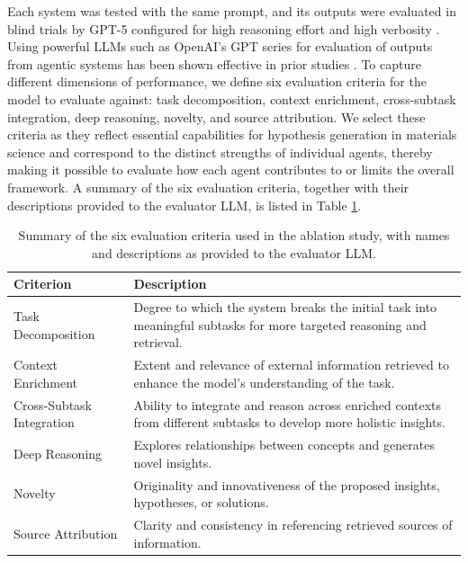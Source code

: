 Each system was tested with the same prompt, and its outputs were evaluated in blind trials by GPT-5 configured for high reasoning effort and high verbosity \cite{openai2024gpt5card}.  Using powerful LLMs such as OpenAI’s GPT series for evaluation of outputs from agentic systems has been shown effective in prior studies \cite{ghafarollahi2025sciagents,ghafarollahi2025sparks,NEURIPS2023_91f18a12}. To capture different dimensions of performance, we define six evaluation criteria for the model to evaluate against: task decomposition, context enrichment, cross-subtask integration, deep reasoning, novelty, and source attribution. We select these criteria as they reflect essential capabilities for hypothesis generation in materials science and correspond to the distinct strengths of individual agents, thereby making it possible to evaluate how each agent contributes to or limits the overall framework. A summary of the six evaluation criteria, together with their descriptions provided to the evaluator LLM, is listed in Table \ref{tab:evaluation-criteria}.

\begin{table}[hb]
\centering
\caption{Summary of the six evaluation criteria used in the ablation study, with names and descriptions as provided to the evaluator LLM.}
\label{tab:evaluation-criteria}
\begin{tabular}{lp{11.25cm}}
\hline
\textbf{Criterion} & \textbf{Description} \\
\hline
Task Decomposition & Degree to which the system breaks the initial task into meaningful subtasks for more targeted reasoning and retrieval. \\
Context Enrichment & Extent and relevance of external information retrieved to enhance the model's understanding of the task. \\
Cross-Subtask Integration & Ability to integrate and reason across enriched contexts from different subtasks to develop more holistic insights. \\
Deep Reasoning & Explores relationships between concepts and generates novel insights. \\
Novelty & Originality and innovativeness of the proposed insights, hypotheses, or solutions. \\
Source Attribution & Clarity and consistency in referencing retrieved sources of information. \\
\hline
\end{tabular}
\end{table}

